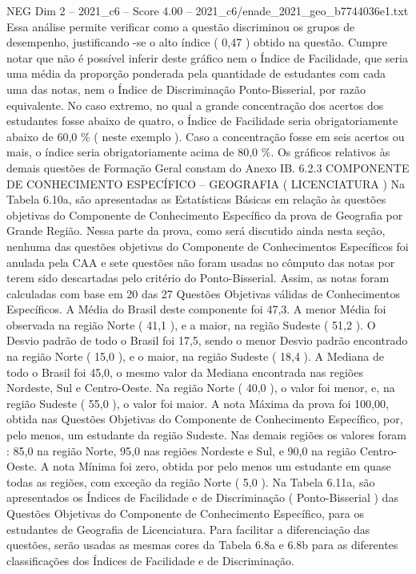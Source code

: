 \begin{textsample}{NEG Dim 2 – 2021\_c6 – Score 4.00 – 2021\_c6/enade\_2021\_geo\_b7744036e1.txt}
Essa análise permite verificar como a questão discriminou os grupos de desempenho, justificando -se o alto índice ( 0,47 ) obtido na questão.
Cumpre notar que não é possível inferir deste gráfico nem o Índice de Facilidade, que seria uma média da proporção ponderada pela quantidade de estudantes com cada uma das notas, nem o Índice de Discriminação Ponto-Bisserial, por razão equivalente.
No caso extremo, no qual a grande concentração dos acertos dos estudantes fosse abaixo de quatro, o Índice de Facilidade seria obrigatoriamente abaixo de 60,0 \% ( neste exemplo ).
Caso a concentração fosse em seis acertos ou mais, o índice seria obrigatoriamente acima de 80,0 \%.
Os gráficos relativos às demais questões de Formação Geral constam do Anexo IB. 6.2.3 COMPONENTE DE CONHECIMENTO ESPECÍFICO – GEOGRAFIA ( LICENCIATURA ) Na Tabela 6.10a, são apresentadas as Estatísticas Básicas em relação às questões objetivas do Componente de Conhecimento Específico da prova de Geografia por Grande Região.
Nessa parte da prova, como será discutido ainda nesta seção, nenhuma das questões objetivas do Componente de Conhecimentos Específicos foi anulada pela CAA e sete questões não foram usadas no cômputo das notas por terem sido descartadas pelo critério do Ponto-Bisserial.
Assim, as notas foram calculadas com base em 20 das 27 Questões Objetivas válidas de Conhecimentos Específicos.
A Média do Brasil deste componente foi 47,3.
A menor Média foi observada na região Norte ( 41,1 ), e a maior, na região Sudeste ( 51,2 ).
O Desvio padrão de todo o Brasil foi 17,5, sendo o menor Desvio padrão encontrado na região Norte ( 15,0 ), e o maior, na região Sudeste ( 18,4 ).
A Mediana de todo o Brasil foi 45,0, o mesmo valor da Mediana encontrada nas regiões Nordeste, Sul e Centro-Oeste.
Na região Norte ( 40,0 ), o valor foi menor, e, na região Sudeste ( 55,0 ), o valor foi maior.
A nota Máxima da prova foi 100,00, obtida nas Questões Objetivas do Componente de Conhecimento Específico, por, pelo menos, um estudante da região Sudeste.
Nas demais regiões os valores foram : 85,0 na região Norte, 95,0 nas regiões Nordeste e Sul, e 90,0 na região Centro-Oeste.
A nota Mínima foi zero, obtida por pelo menos um estudante em quase todas as regiões, com exceção da região Norte ( 5,0 ).
Na Tabela 6.11a, são apresentados os Índices de Facilidade e de Discriminação ( Ponto-Bisserial ) das Questões Objetivas do Componente de Conhecimento Específico, para os estudantes de Geografia de Licenciatura.
Para facilitar a diferenciação das questões, serão usadas as mesmas cores da Tabela 6.8a e 6.8b para as diferentes classificações dos Índices de Facilidade e de Discriminação.

\end{textsample}
